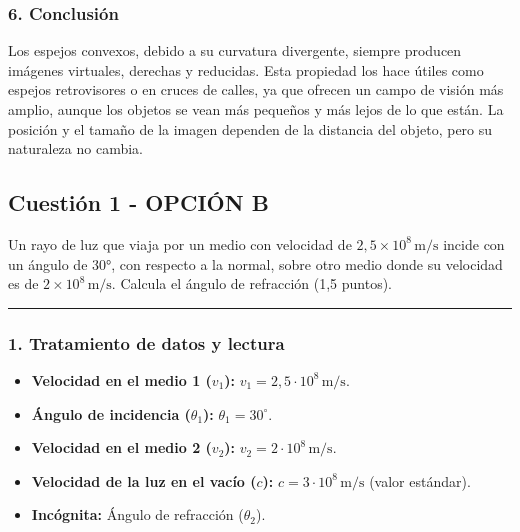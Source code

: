 \subsubsection*{6. Conclusión}
\begin{cajaconclusion}
Los espejos convexos, debido a su curvatura divergente, siempre producen imágenes virtuales, derechas y reducidas. Esta propiedad los hace útiles como espejos retrovisores o en cruces de calles, ya que ofrecen un campo de visión más amplio, aunque los objetos se vean más pequeños y más lejos de lo que están. La posición y el tamaño de la imagen dependen de la distancia del objeto, pero su naturaleza no cambia.
\end{cajaconclusion}

\newpage

\subsection{Cuestión 1 - OPCIÓN B}
\label{subsec:3B_2007_jun_ord}

\begin{cajaenunciado}
Un rayo de luz que viaja por un medio con velocidad de $2,5\times10^{8}\,\text{m/s}$ incide con un ángulo de 30°, con respecto a la normal, sobre otro medio donde su velocidad es de $2\times10^{8}\,\text{m/s}$. Calcula el ángulo de refracción (1,5 puntos).
\end{cajaenunciado}
\hrule

\subsubsection*{1. Tratamiento de datos y lectura}
\begin{itemize}
    \item \textbf{Velocidad en el medio 1 ($v_1$):} $v_1 = 2,5 \cdot 10^8\,\text{m/s}$.
    \item \textbf{Ángulo de incidencia ($\theta_1$):} $\theta_1 = 30^\circ$.
    \item \textbf{Velocidad en el medio 2 ($v_2$):} $v_2 = 2 \cdot 10^8\,\text{m/s}$.
    \item \textbf{Velocidad de la luz en el vacío ($c$):} $c = 3 \cdot 10^8\,\text{m/s}$ (valor estándar).
    \item \textbf{Incógnita:} Ángulo de refracción ($\theta_2$).
\end{itemize}

